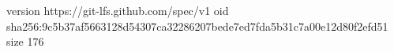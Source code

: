 version https://git-lfs.github.com/spec/v1
oid sha256:9c5b37af5663128d54307ca32286207bede7ed7fda5b31c7a00e12d80f2efd51
size 176
